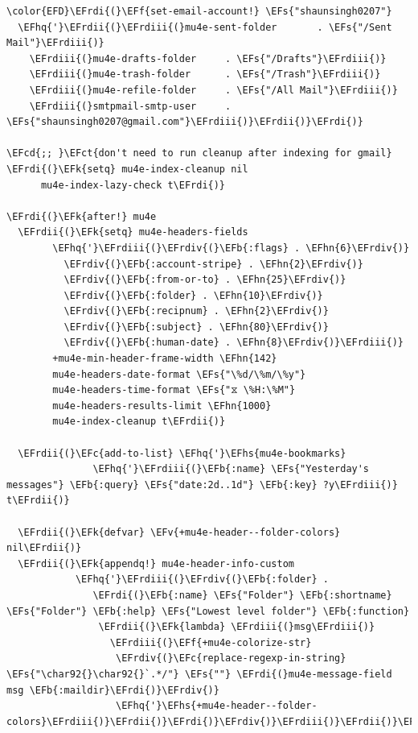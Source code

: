 \documentclass{scrartcl}
\newcommand{\EFk}[1]{\textcolor{EFk}{#1}} %
\newcommand{\EFs}[1]{\textcolor{EFs}{#1}} %
\newcommand{\EFb}[1]{\textcolor{EFb}{#1}} %
\newcommand{\EFct}[1]{\textcolor{EFct}{#1}} %
\newcommand{\EFc}[1]{\textcolor{EFc}{#1}} %
\newcommand{\EFv}[1]{\textcolor{EFv}{#1}} %
\newcommand{\EFf}[1]{\textcolor{EFf}{#1}} %
\newcommand{\EFcd}[1]{\textcolor{EFcd}{#1}} %
\newcommand{\EFhn}[1]{\textcolor{EFhn}{\textbf{#1}}} %
\newcommand{\EFhq}[1]{\textcolor{EFhq}{#1}} %
\newcommand{\EFhs}[1]{\textcolor{EFhs}{#1}} %
\newcommand{\EFrdi}[1]{\textcolor{EFrdi}{#1}} %
\newcommand{\EFrdii}[1]{\textcolor{EFrdii}{#1}} %
\newcommand{\EFrdiii}[1]{\textcolor{EFrdiii}{#1}} %
\newcommand{\EFrdiv}[1]{\textcolor{EFrdiv}{#1}} %
\begin{document}
\begin{Code}
\begin{Verbatim}[]
\color{EFD}\EFrdi{(}\EFf{set-email-account!} \EFs{"shaunsingh0207"}
  \EFhq{'}\EFrdii{(}\EFrdiii{(}mu4e-sent-folder       . \EFs{"/Sent Mail"}\EFrdiii{)}
    \EFrdiii{(}mu4e-drafts-folder     . \EFs{"/Drafts"}\EFrdiii{)}
    \EFrdiii{(}mu4e-trash-folder      . \EFs{"/Trash"}\EFrdiii{)}
    \EFrdiii{(}mu4e-refile-folder     . \EFs{"/All Mail"}\EFrdiii{)}
    \EFrdiii{(}smtpmail-smtp-user     . \EFs{"shaunsingh0207@gmail.com"}\EFrdiii{)}\EFrdii{)}\EFrdi{)}

\EFcd{;; }\EFct{don't need to run cleanup after indexing for gmail}
\EFrdi{(}\EFk{setq} mu4e-index-cleanup nil
      mu4e-index-lazy-check t\EFrdi{)}

\EFrdi{(}\EFk{after!} mu4e
  \EFrdii{(}\EFk{setq} mu4e-headers-fields
        \EFhq{'}\EFrdiii{(}\EFrdiv{(}\EFb{:flags} . \EFhn{6}\EFrdiv{)}
          \EFrdiv{(}\EFb{:account-stripe} . \EFhn{2}\EFrdiv{)}
          \EFrdiv{(}\EFb{:from-or-to} . \EFhn{25}\EFrdiv{)}
          \EFrdiv{(}\EFb{:folder} . \EFhn{10}\EFrdiv{)}
          \EFrdiv{(}\EFb{:recipnum} . \EFhn{2}\EFrdiv{)}
          \EFrdiv{(}\EFb{:subject} . \EFhn{80}\EFrdiv{)}
          \EFrdiv{(}\EFb{:human-date} . \EFhn{8}\EFrdiv{)}\EFrdiii{)}
        +mu4e-min-header-frame-width \EFhn{142}
        mu4e-headers-date-format \EFs{"\%d/\%m/\%y"}
        mu4e-headers-time-format \EFs{"⧖ \%H:\%M"}
        mu4e-headers-results-limit \EFhn{1000}
        mu4e-index-cleanup t\EFrdii{)}

  \EFrdii{(}\EFc{add-to-list} \EFhq{'}\EFhs{mu4e-bookmarks}
               \EFhq{'}\EFrdiii{(}\EFb{:name} \EFs{"Yesterday's messages"} \EFb{:query} \EFs{"date:2d..1d"} \EFb{:key} ?y\EFrdiii{)} t\EFrdii{)}

  \EFrdii{(}\EFk{defvar} \EFv{+mu4e-header--folder-colors} nil\EFrdii{)}
  \EFrdii{(}\EFk{appendq!} mu4e-header-info-custom
            \EFhq{'}\EFrdiii{(}\EFrdiv{(}\EFb{:folder} .
               \EFrdi{(}\EFb{:name} \EFs{"Folder"} \EFb{:shortname} \EFs{"Folder"} \EFb{:help} \EFs{"Lowest level folder"} \EFb{:function}
                \EFrdii{(}\EFk{lambda} \EFrdiii{(}msg\EFrdiii{)}
                  \EFrdiii{(}\EFf{+mu4e-colorize-str}
                   \EFrdiv{(}\EFc{replace-regexp-in-string} \EFs{"\char92{}\char92{}`.*/"} \EFs{""} \EFrdi{(}mu4e-message-field msg \EFb{:maildir}\EFrdi{)}\EFrdiv{)}
                   \EFhq{'}\EFhs{+mu4e-header--folder-colors}\EFrdiii{)}\EFrdii{)}\EFrdi{)}\EFrdiv{)}\EFrdiii{)}\EFrdii{)}\EFrdi{)}
\end{Verbatim}
\end{Code}
\end{document}
